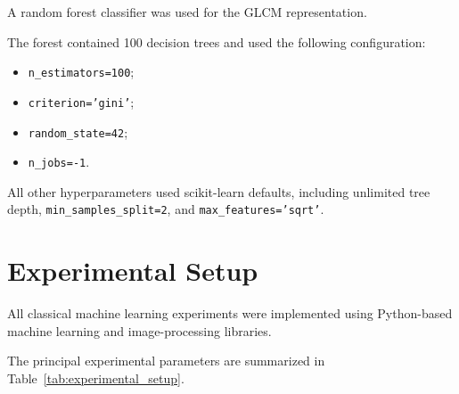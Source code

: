 \documentclass[11pt,a4paper]{article}
\begin{document}
A random forest classifier was used for the GLCM representation.

The forest contained 100 decision trees and used the following configuration:

\begin{itemize}
    \item \texttt{n\_estimators=100};
    \item \texttt{criterion='gini'};
    \item \texttt{random\_state=42};
    \item \texttt{n\_jobs=-1}.
\end{itemize}

All other hyperparameters used scikit-learn defaults, including unlimited tree depth, \texttt{min\_samples\_split=2}, and \texttt{max\_features='sqrt'}.


\section{Experimental Setup}

All classical machine learning experiments were implemented using Python-based machine learning and image-processing libraries.

The principal experimental parameters are summarized in Table~\ref{tab:experimental_setup}.
\end{document}
